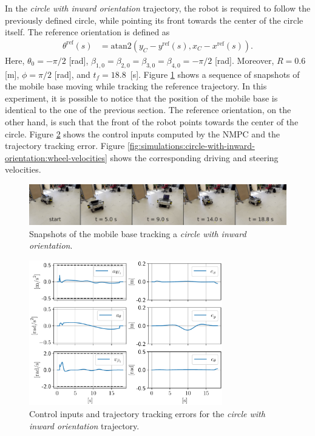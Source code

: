 In the \textit{circle with inward orientation} trajectory, the robot is required to follow the previously defined circle, while pointing its front towards the center of the circle itself. The reference orientation is defined as
\begin{subequations}
\begin{align*}
    \theta^{\mathrm{ref}}(s) &= \mathrm{atan2}(y_C - y^{\mathrm{ref}}(s), x_C - x^{\mathrm{ref}}(s)).
\end{align*}
\end{subequations}
Here, $\theta_0=-\pi/2$ [rad], $\beta_{1,0}=\beta_{2,0}=\beta_{3,0}=\beta_{4,0}=-\pi/2$ [rad]. Moreover, $R=0.6$ [m], $\phi=\pi/2$ [rad], and $t_f=18.8$~[s].
Figure \ref{fig:experiments:circle-with-inward-orientation:snapshots} shows a sequence of snapshots of the mobile base moving while tracking the reference trajectory. In this experiment, it is possible to notice that the position of the mobile base is identical to the one of the previous section. The reference orientation, on the other hand, is such that the front of the robot points towards the center of the circle. Figure \ref{fig:simulations:circle-with-inward-orientation:inputs-and-errors} shows the control inputs computed by the NMPC and the trajectory tracking error. Figure \ref{fig:simulations:circle-with-inward-orientation:wheel-velocities} shows the corresponding driving and steering velocities.
\begin{figure}
    \centering
    \includegraphics[width=\textwidth]{figures/SWMR/simulations/circular_with_inward_orientation/snapshots.jpeg}
    \caption{Snapshots of the mobile base tracking a \textit{circle with inward orientation}.}
    \label{fig:experiments:circle-with-inward-orientation:snapshots}
\end{figure}
\begin{figure}
    \centering
    \includegraphics[width=0.75\textwidth]{figures/SWMR/simulations/circular_with_inward_orientation/inputs_and_errors.pdf}
    \caption{Control inputs and trajectory tracking errors for the \textit{circle with inward orientation} trajectory.}
    \label{fig:simulations:circle-with-inward-orientation:inputs-and-errors}
\end{figure}
